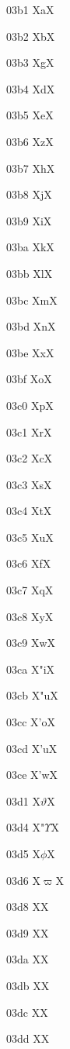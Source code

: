 \documentclass[11pt]{article}
\begin{document}
03b1 X{\textgreek{a}}X

03b2 X{\textgreek{b}}X

03b3 X{\textgreek{g}}X

03b4 X{\textgreek{d}}X

03b5 X{\textgreek{e}}X

03b6 X{\textgreek{z}}X

03b7 X{\textgreek{h}}X

03b8 X{\textgreek{j}}X

03b9 X{\textgreek{i}}X

03ba X{\textgreek{k}}X

03bb X{\textgreek{l}}X

03bc X{\textgreek{m}}X

03bd X{\textgreek{n}}X

03be X{\textgreek{x}}X

03bf X{\textgreek{o}}X

03c0 X{\textgreek{p}}X

03c1 X{\textgreek{r}}X

03c2 X{\textgreek{c}}X

03c3 X{\textgreek{s}}X

03c4 X{\textgreek{t}}X

03c5 X{\textgreek{u}}X

03c6 X{\textgreek{f}}X

03c7 X{\textgreek{q}}X

03c8 X{\textgreek{y}}X

03c9 X{\textgreek{w}}X

03ca X{\textgreek{"i}}X

03cb X{\textgreek{"u}}X

03cc X{\textgreek{'o}}X

03cd X{\textgreek{'u}}X

03ce X{\textgreek{'w}}X

03d1 X{\ensuremath{\vartheta}}X

03d4 X{\textgreek{"\ensuremath{\Upsilon}}}X

03d5 X{\ensuremath{\phi}}X

03d6 X{\ensuremath{\varpi}}X

03d8 X{\textgreek{\Koppa}}X

03d9 X{\textgreek{\coppa}}X

03da X{\textgreek{\Stigma}}X

03db X{\textgreek{\stigma}}X

03dc X{\textgreek{\Digamma}}X

03dd X{\textgreek{\digamma}}X
\end{document}
